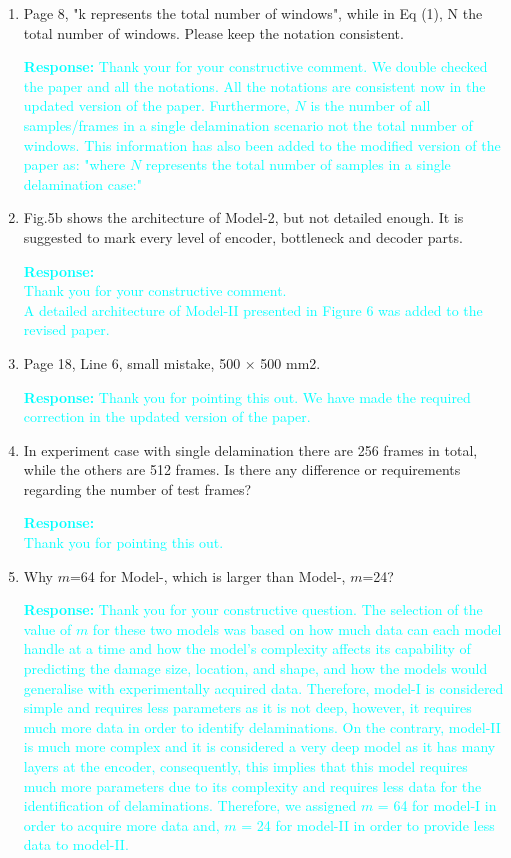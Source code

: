 \documentclass[11pt,a2paper]{report}
\newcommand{\RNum}[1]{\uppercase\expandafter{\romannumeral #1\relax}}
\begin{document}
\begin{enumerate}
	\item Page 8, "k represents the total number of windows", while in Eq (1), 
	N the total number of windows.
	Please keep the notation consistent.
	
	\textcolor{Cyan}{
		\textbf{Response:}
		Thank your for your constructive comment. 
		We double checked the paper and all the notations.
		All the notations are consistent now in the updated version of the 
		paper. 
		Furthermore, \(N\) is the number of all samples/frames in a single 
		delamination scenario not the total number of windows.
		This information has also been added to the modified version of the 
		paper as:
		"where \(N\) represents the total number of samples in a single 
		delamination case:"
	}	
	
	\item Fig.5b shows the architecture of Model-2, but not detailed enough.
	It is suggested to mark every level of encoder, bottleneck and decoder 
	parts.
	
	\textcolor{Cyan}{
		\textbf{Response:} \\
		Thank you for your constructive comment.\\
		A detailed architecture of Model-II presented in Figure 6 was added to the revised paper.
	}
	
	\item Page 18, Line 6, small mistake, 500 × 500 mm2.
	
	\textcolor{Cyan}{
		\textbf{Response:}
		Thank you for pointing this out.
		We have made the required correction in the updated version of the 
		paper.
	}	

	\item In experiment case with single delamination there are 256 frames in 
	total, while the others are 512 frames.
	Is there any difference or requirements regarding the number of test frames?

\textcolor{Cyan}{
	\textbf{Response:} \\
	Thank you for pointing this out. \\
	}

	\item Why \(m\)=64 for Model-\RNum{1}, which is larger than Model-\RNum{2}, 
	\(m\)=24?

\textcolor{Cyan}{
	\textbf{Response:}
	Thank you for your constructive question.
	The selection of the value of \(m\) for these two models was based on how 
	much data can each model handle at a time and how the model's complexity 
	affects its capability of predicting the damage size, location, and shape, 
	and how the models would generalise with experimentally acquired data. 
	Therefore, model-I is considered simple and requires less parameters as it 
	is not deep, however, it requires much more data in order to identify 
	delaminations. 
	On the contrary, model-II is much more complex and it is considered a very 
	deep model as it has many layers at the encoder, consequently, this implies 
	that this model requires much more parameters due to its complexity and 
	requires less data for the identification of delaminations.
	Therefore, we assigned \(m\) = 64 for model-I in order to acquire more data 
	and, \(m\) = 24 for model-II in order to provide less data to model-II.
}


\end{enumerate}
\end{document}

